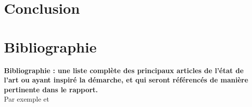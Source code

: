 \documentclass{article}
\begin{document}
\section{Conclusion}
\label{sec:conclusion}


\section{Bibliographie}

\textbf{Bibliographie : une liste complète des principaux articles de l'état de l'art ou ayant inspiré la démarche, et qui seront référencés de manière pertinente dans le rapport.}\\

Par exemple \citep{Goodfellow-et-al-2016} et \citep{test}



\end{document}
